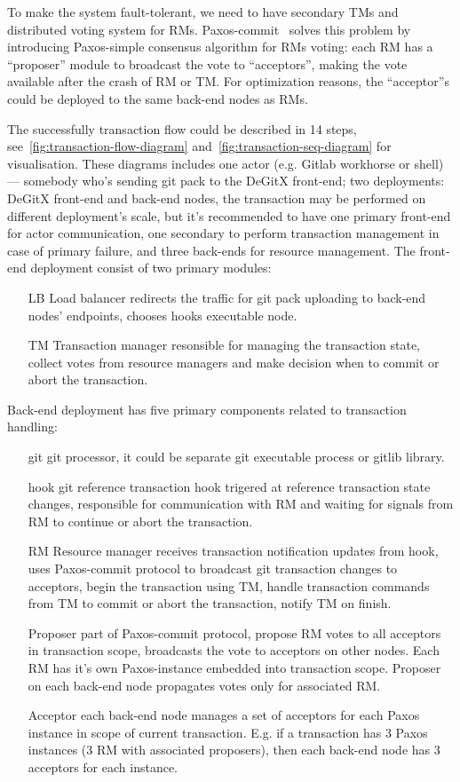 \documentclass[acmlarge, screen, nonacm, 11pt]{acmart}
\begin{document}
To make the system fault-tolerant, we need to have secondary TMs and distributed voting system for RMs.
Paxos-commit~\cite{consensus-on-transaction-commit} solves this problem by introducing Paxos-simple
consensus algorithm for RMs voting: each RM has a ``proposer'' module to broadcast the vote to ``acceptors'',
making the vote available after the crash of RM or TM. For optimization reasons, the ``acceptor''s could be
deployed to the same back-end nodes as RMs.

The successfully transaction flow could be described in 14 steps, see~\ref{fig:transaction-flow-diagram}
and~\ref{fig:transaction-seq-diagram} for visualisation. These diagrams includes one actor (e.g. Gitlab
workhorse or shell) --- somebody who's sending git pack to the DeGitX front-end; two deployments:
DeGitX front-end and back-end nodes, the transaction may be performed on different deployment's scale,
but it's recommended to have one primary front-end for actor communication, one secondary to perform
transaction management in case of primary failure, and three back-ends for resource management.
The front-end deployment consist of two primary modules:
\begin{itemize}
  \item[LB] Load balancer redirects the traffic for git pack uploading to back-end nodes' endpoints,
    chooses hooks executable node.
  \item[TM] Transaction manager resonsible for managing the transaction state, collect votes from
    resource managers and make decision when to commit or abort the transaction.
\end{itemize}
Back-end deployment has five primary components related to transaction handling:
\begin{itemize}
  \item[git] git processor, it could be separate git executable process or gitlib library.
  \item[hook] git reference transaction hook trigered at reference transaction state changes,
    responsible for communication with RM and waiting for signals from RM to continue or abort the
    transaction.
  \item[RM] Resource manager receives transaction notification updates from hook, uses
    Paxos-commit protocol to broadcast git transaction changes to acceptors, begin the transaction
    using TM, handle transaction commands from TM to commit or abort the transaction,
    notify TM on finish.
  \item[Proposer] part of Paxos-commit protocol, propose RM votes to all acceptors
    in transaction scope, broadcasts the vote to acceptors on other nodes. Each RM has
    it's own Paxos-instance embedded into transaction scope. Proposer on each back-end node
    propagates votes only for associated RM.
  \item[Acceptor] each back-end node manages a set of acceptors for each Paxos instance in
    scope of current transaction. E.g. if a transaction has 3 Paxos instances (3 RM with associated
    proposers), then each back-end node has 3 acceptors for each instance.
\end{itemize}
\end{document}
